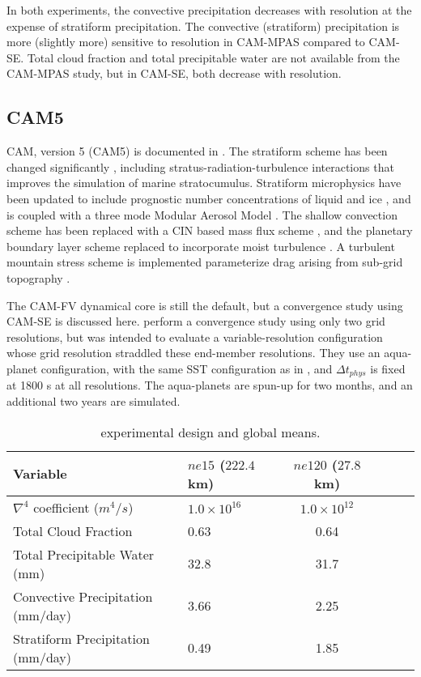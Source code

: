 In both experiments, the convective precipitation decreases with resolution at the expense of stratiform precipitation. The convective (stratiform) precipitation is more (slightly more) sensitive to resolution in CAM-MPAS compared to CAM-SE. Total cloud fraction and total precipitable water are not available from the CAM-MPAS study, but in CAM-SE, both decrease with resolution.

\subsection{CAM5}

CAM, version 5 (CAM5) is documented in \citep{CAM5}. The stratiform scheme has been changed significantly \citep{PETAL2014JCLIM}, including stratus-radiation-turbulence interactions that improves the simulation of marine stratocumulus. Stratiform microphysics have been updated to include prognostic number concentrations of liquid and ice \citep{MG2008JC}, and is coupled with a three mode Modular Aerosol Model \citep{MAM}. The shallow convection scheme has been replaced with a CIN based mass flux scheme \citep{PB2009JC}, and the planetary boundary layer scheme replaced to incorporate moist turbulence \citep{BC2009JCLIM}. A turbulent mountain stress scheme is implemented parameterize drag arising from sub-grid topography \citep{CAM5}.

The CAM-FV dynamical core is still the default, but a convergence study using CAM-SE is discussed here. \cite{ZetAl2014JCb} perform a convergence study using only two grid resolutions, but was intended to evaluate a variable-resolution configuration whose grid resolution straddled these end-member resolutions. They use an aqua-planet configuration, with the same SST configuration as in \cite{W2008TELLUS} \citep[`CONTROL' in][]{NH2000ASL}, and $\Delta t_{phys}$ is fixed at 1800 s at all resolutions. The aqua-planets are spun-up for two months, and an additional two years are simulated.

 \begin{table}
 \caption{\cite{ZetAl2014JCb} experimental design and global means.}
 \centering
 \scriptsize
 \begin{tabular}{llcccc}
 \hline
Variable & $ne15$ ($222.4$ km) & $ne120$ ($27.8$ km)\\
 \hline
   $\nabla^{4}$ coefficient ($m^4/s$) & $1.0 \times 10^{16}$ & $1.0 \times 10^{12}$ \\
   Total Cloud Fraction & 0.63 & 0.64 \\
   Total Precipitable Water (mm) & 32.8 & 31.7 \\
   Convective Precipitation (mm/day) & 3.66 & 2.25 \\
   Stratiform Precipitation (mm/day) & 0.49 & 1.85 \\
 \hline
 \end{tabular}
 \label{tbl:table1-5}
 \end{table}

